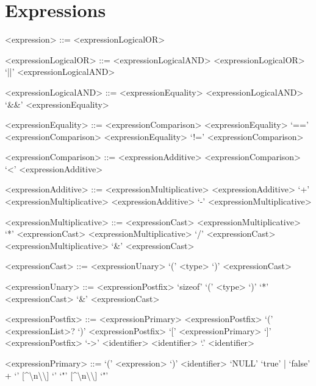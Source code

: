 \section{Expressions}

\setlength{\grammarparsep}{20pt plus 1pt minus 1pt}
\setlength{\grammarindent}{10em}
\begin{grammar}

<expression> ::= <expressionLogicalOR>

<expressionLogicalOR> ::= <expressionLogicalAND>
\alt <expressionLogicalOR> `||' <expressionLogicalAND>

<expressionLogicalAND> ::= <expressionEquality>
\alt <expressionLogicalAND> `&&' <expressionEquality>

<expressionEquality> ::= <expressionComparison>
\alt <expressionEquality> `==' <expressionComparison>
\alt <expressionEquality> `!=' <expressionComparison>

<expressionComparison> ::= <expressionAdditive>
\alt <expressionComparison> `<' <expressionAdditive>

<expressionAdditive> ::= <expressionMultiplicative>
\alt <expressionAdditive> `+' <expressionMultiplicative>
\alt <expressionAdditive> `-' <expressionMultiplicative>

<expressionMultiplicative> ::= <expressionCast>
\alt <expressionMultiplicative> `*' <expressionCast>
\alt <expressionMultiplicative> `/' <expressionCast>
\alt <expressionMultiplicative> `&' <expressionCast>

<expressionCast> ::= <expressionUnary>
\alt `(' <type> `)' <expressionCast>

<expressionUnary> ::= <expressionPostfix>
\alt `sizeof' `(' <type> `)'
\alt `*' <expressionCast>
\alt `&' <expressionCast>

<expressionPostfix> ::= <expressionPrimary>
\alt <expressionPostfix> `(' <expressionList>? `)'
\alt <expressionPostfix> `[' <expressionPrimary> `]'
\alt <expressionPostfix> `->' <identifier>
\alt <identifier> `.' <identifier>

<expressionPrimary> ::= `(' <expression> `)'
\alt <identifier>
\alt `NULL'
\alt `true' | `false'
\alt [0-9]+
\alt `\textquotesingle' [\^{}\textquotesingle\textbackslash n\textbackslash\textbackslash] `\textquotesingle'
\alt `"' [\^{}\textquotedbl\textbackslash n\textbackslash\textbackslash] `"'

\end{grammar}
